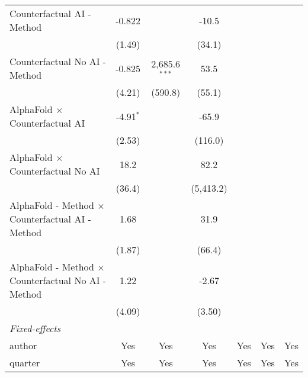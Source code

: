 \begin{tabular}{lcccccc}
   Counterfactual AI - Method                                 & -0.822      &                 & -10.5       &         &              &   \\   
                                                              & (1.49)      &                 & (34.1)      &         &              &   \\   
   Counterfactual No AI - Method                              & -0.825      & 2,685.6$^{***}$ & 53.5        &         &              &   \\   
                                                              & (4.21)      & (590.8)         & (55.1)      &         &              &   \\   
   AlphaFold $\times$ Counterfactual AI                       & -4.91$^{*}$ &                 & -65.9       &         &              &   \\   
                                                              & (2.53)      &                 & (116.0)     &         &              &   \\   
   AlphaFold $\times$ Counterfactual No AI                    & 18.2        &                 & 82.2        &         &              &   \\   
                                                              & (36.4)      &                 & (5,413.2)   &         &              &   \\   
   AlphaFold - Method $\times$ Counterfactual AI - Method     & 1.68        &                 & 31.9        &         &              &   \\   
                                                              & (1.87)      &                 & (66.4)      &         &              &   \\   
   AlphaFold - Method $\times$ Counterfactual No AI - Method  & 1.22        &                 & -2.67       &         &              &   \\   
                                                              & (4.09)      &                 & (3.50)      &         &              &   \\   
   \midrule
   \emph{Fixed-effects}\\
   author                                                     & Yes         & Yes             & Yes         & Yes     & Yes          & Yes\\  
   quarter                                                    & Yes         & Yes             & Yes         & Yes     & Yes          & Yes\\  

\end{tabular}
